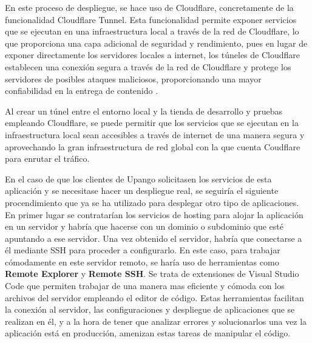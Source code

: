 \documentclass[11pt]{article}
\begin{document}
En este proceso de despliegue, se hace uso de Cloudflare, concretamente de la funcionalidad Cloudflare Tunnel. Esta funcionalidad permite exponer servicios que se ejecutan
en una infraestructura local a través de la red de Cloudflare, lo que proporciona una capa adicional de seguridad y rendimiento, pues en lugar de 
exponer directamente los servidores locales a internet, los túneles de Cloudflare establecen una conexión segura a través de la red de Cloudflare y protege los
servidores de posibles ataques maliciosos, proporcionando una mayor confiabilidad en la entrega de contenido \cite{cloudflare}. 

Al crear un túnel entre el entorno local y la tienda de desarrollo y pruebas empleando Cloudflare, se puede permitir que los servicios que se ejecutan en la infraestructura local
sean accesibles a través de internet de una manera segura y aprovechando la gran infraestructura de red global con la que cuenta Coudflare para enrutar el tráfico.

En el caso de que los clientes de Upango solicitasen los servicios de esta aplicación y se necesitase hacer un despliegue real, se seguiría el siguiente procendimiento que ya se ha utilizado para
desplegar otro tipo de aplicaciones.
En primer lugar se contratarían los servicios de hosting para alojar la aplicación en un servidor y habría que hacerse con un dominio o subdominio
que esté apuntando a ese servidor. Una vez obtenido el servidor, habría que conectarse a él mediante SSH para proceder a configurarlo. En este caso, para trabajar cómodamente en este servidor remoto,
se haría uso de herramientas como \textbf{Remote Explorer} y \textbf{Remote SSH}. Se trata de extensiones de Visual Studio Code que permiten trabajar de una manera mas eficiente y cómoda con los archivos del
servidor empleando el editor de código. Estas herramientas facilitan la conexión al servidor, las configuraciones y despliegue de aplicaciones que se realizan en él, y a la hora 
de tener que analizar errores y solucionarlos una vez la aplicación está en producción, amenizan estas tareas de manipular el código.
\end{document}
